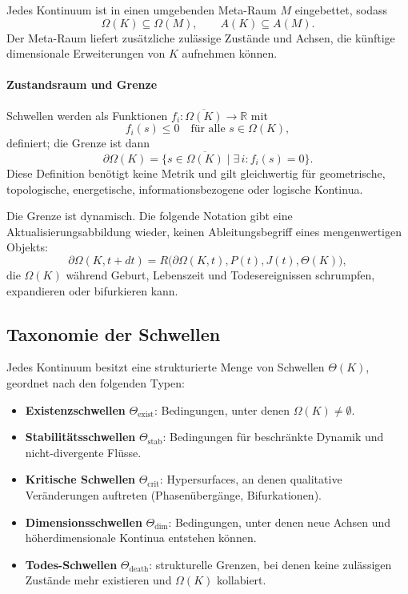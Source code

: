 Jedes Kontinuum ist in einen umgebenden Meta-Raum \(M\) eingebettet, sodass
\[
    \Omega(K)\subseteq\Omega(M), \qquad A(K)\subseteq A(M).
\]
Der Meta-Raum liefert zusätzliche zulässige Zustände und Achsen, die künftige
dimensionale Erweiterungen von \(K\) aufnehmen können.

\paragraph{Zustandsraum und Grenze}
Schwellen werden als Funktionen \(f_i : \overline{\Omega(K)} \to \mathbb{R}\) mit
\[
    f_i(s) \le 0 \quad\text{für alle } s \in \Omega(K),
\]
definiert; die Grenze ist dann
\[
    \partial\Omega(K) = \{ s \in \overline{\Omega(K)} \mid \exists\, i: f_i(s) = 0 \}.
\]
Diese Definition benötigt keine Metrik und gilt gleichwertig für geometrische,
topologische, energetische, informationsbezogene oder logische Kontinua.

Die Grenze ist dynamisch. Die folgende Notation gibt eine Aktualisierungsabbildung
wieder, keinen Ableitungsbegriff eines mengenwertigen Objekts:
\[
    \partial\Omega(K,t+dt) =
    R\big(\partial\Omega(K,t),P(t),J(t),\Theta(K)\big),
\]
die \(\Omega(K)\) während Geburt, Lebenszeit und Todesereignissen schrumpfen,
expandieren oder bifurkieren kann.

\subsection{Taxonomie der Schwellen}

Jedes Kontinuum besitzt eine strukturierte Menge von Schwellen \(\Theta(K)\),
geordnet nach den folgenden Typen:

\begin{itemize}
    \item \textbf{Existenzschwellen} \(\Theta_{\mathrm{exist}}\): Bedingungen,
          unter denen \(\Omega(K)\neq\emptyset\).
    \item \textbf{Stabilitätsschwellen} \(\Theta_{\mathrm{stab}}\): Bedingungen
          für beschränkte Dynamik und nicht-divergente Flüsse.
    \item \textbf{Kritische Schwellen} \(\Theta_{\mathrm{crit}}\):
          Hypersurfaces, an denen qualitative Veränderungen auftreten
          (Phasenübergänge, Bifurkationen).
    \item \textbf{Dimensionsschwellen} \(\Theta_{\mathrm{dim}}\): Bedingungen,
          unter denen neue Achsen und höherdimensionale Kontinua entstehen können.
    \item \textbf{Todes-Schwellen} \(\Theta_{\mathrm{death}}\): strukturelle
          Grenzen, bei denen keine zulässigen Zustände mehr existieren und
          \(\Omega(K)\) kollabiert.
\end{itemize}

